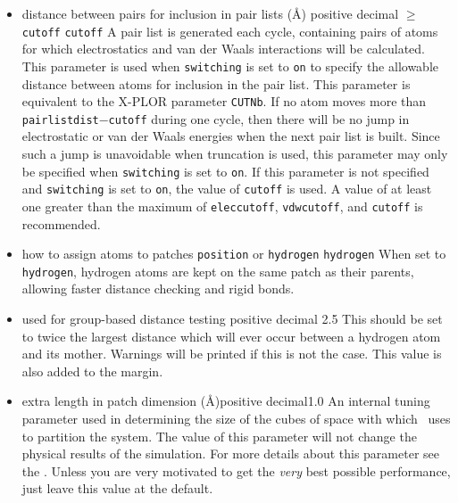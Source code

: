 \begin{itemize}
\item
{}%
{distance between pairs for inclusion in pair lists (\AA)}%
{positive decimal $\geq$ \verb!cutoff!}%
{\verb!cutoff!}%
{%
A pair list is generated each cycle, 
containing pairs of atoms for which 
electrostatics and van der Waals interactions will be calculated.
This parameter is used when \verb!switching! is set to \verb!on! to
specify the allowable distance between atoms for inclusion in the
pair list.  
This parameter is equivalent to the X-PLOR parameter \verb!CUTNb!.
If no atom moves more than \verb!pairlistdist!$-$\verb!cutoff! during
one cycle, then there will be no jump in electrostatic or van der
Waals energies when the next pair list is built.  Since such a jump
is unavoidable when truncation is used, this parameter may only
be specified when \verb!switching! is set to \verb!on!.  If this
parameter is not specified and \verb!switching! is set to \verb!on!,
the value of \verb!cutoff! is used.  
A value of at least one greater than the maximum of 
\verb!eleccutoff!, \verb!vdwcutoff!, and \verb!cutoff! 
is recommended.  
}

\item
{}%
{how to assign atoms to patches}%
{\verb!position! or \verb!hydrogen!}%
{\verb!hydrogen!}%
{%
When set to \verb!hydrogen!, hydrogen atoms are kept on the same patch as their parents, allowing faster distance checking and rigid bonds.
}

\item
{}%
{used for group-based distance testing}%
{positive decimal}%
{2.5}%
{%
This should be set to twice the largest distance which will ever occur between a hydrogen atom and its mother.  Warnings will be printed if this is not the case.  This value is also added to the margin.
}

\item
{}%
{extra length in patch dimension (\AA)}{positive decimal}{1.0}%
{An internal tuning parameter used in determining the size of the cubes 
of space with which \NAMD\ uses to partition the system.  The value of 
this parameter will not change the physical results of the simulation.  
For more details about this parameter see the \PG.  
Unless you are very motivated to get the {\it very} best 
possible performance, just leave this value at the default.}


\end{itemize}

